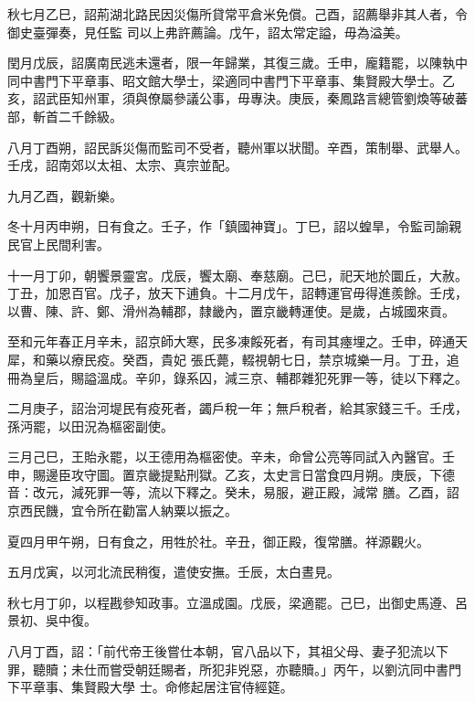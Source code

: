 \begin{pinyinscope}
 秋七月乙巳，詔荊湖北路民因災傷所貸常平倉米免償。己酉，詔薦舉非其人者，令御史臺彈奏，見任監
 司以上弗許薦論。戊午，詔太常定謚，毋為溢美。



 閏月戊辰，詔廣南民逃未還者，限一年歸業，其復三歲。壬申，龐籍罷，以陳執中同中書門下平章事、昭文館大學士，梁適同中書門下平章事、集賢殿大學士。乙亥，詔武臣知州軍，須與僚屬參議公事，毋專決。庚辰，秦鳳路言總管劉煥等破蕃部，斬首二千餘級。



 八月丁酉朔，詔民訴災傷而監司不受者，聽州軍以狀聞。辛酉，策制舉、武舉人。壬戌，詔南郊以太祖、太宗、真宗並配。



 九月乙酉，觀新樂。



 冬十月丙申朔，日有食之。壬子，作「鎮國神寶」。丁巳，詔以蝗旱，令監司諭親民官上民間利害。



 十一月丁卯，朝饗景靈宮。戊辰，饗太廟、奉慈廟。己巳，祀天地於圜丘，大赦。丁丑，加恩百官。戊子，放天下逋負。十二月戊午，詔轉運官毋得進羨餘。壬戌，以曹、陳、許、鄭、滑州為輔郡，隸畿內，置京畿轉運使。是歲，占城國來貢。



 至和元年春正月辛未，詔京師大寒，民多凍餒死者，有司其瘞埋之。壬申，碎通天犀，和藥以療民疫。癸酉，貴妃
 張氏薨，輟視朝七日，禁京城樂一月。丁丑，追冊為皇后，賜謚溫成。辛卯，錄系囚，減三京、輔郡雜犯死罪一等，徒以下釋之。



 二月庚子，詔治河堤民有疫死者，蠲戶稅一年；無戶稅者，給其家錢三千。壬戌，孫沔罷，以田況為樞密副使。



 三月己巳，王貽永罷，以王德用為樞密使。辛未，命曾公亮等同試入內醫官。壬申，賜邊臣攻守圖。置京畿提點刑獄。乙亥，太史言日當食四月朔。庚辰，下德音：改元，減死罪一等，流以下釋之。癸未，易服，避正殿，減常
 膳。乙酉，詔京西民饑，宜令所在勸富人納粟以振之。



 夏四月甲午朔，日有食之，用牲於社。辛丑，御正殿，復常膳。祥源觀火。



 五月戊寅，以河北流民稍復，遣使安撫。壬辰，太白晝見。



 秋七月丁卯，以程戡參知政事。立溫成園。戊辰，梁適罷。己巳，出御史馬遵、呂景初、吳中復。



 八月丁酉，詔：「前代帝王後嘗仕本朝，官八品以下，其祖父母、妻子犯流以下罪，聽贖；未仕而嘗受朝廷賜者，所犯非兇惡，亦聽贖。」丙午，以劉沆同中書門下平章事、集賢殿大學
 士。命修起居注官侍經筵。




\end{pinyinscope}
